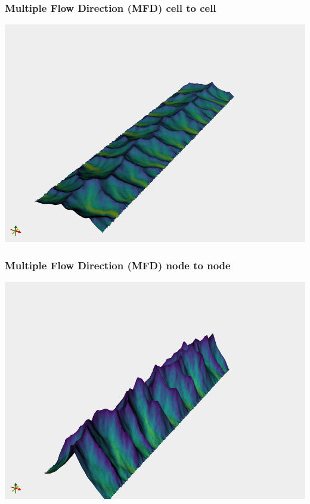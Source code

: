 \documentclass[aspectratio=169]{beamer}
\begin{document}
\begin{frame}
    \frametitle{Multiple Flow Direction (MFD) cell to cell}
    \includegraphics[height=0.9\paperheight]{./figures/flem-mfd-c2c.png}
\end{frame}

\begin{frame}
    \frametitle{Multiple Flow Direction (MFD) node to node}
    \includegraphics[height=0.9\paperheight]{./figures/flem-mfd-n2n.png}
\end{frame}
\end{document}

